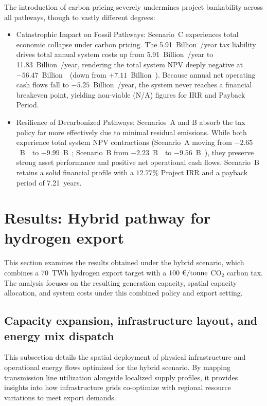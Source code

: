 \documentclass[preprint,12pt]{elsarticle}
\begin{document}
The introduction of carbon pricing severely undermines project bankability across all pathways, though to vastly different degrees:

\begin{itemize}
    \item {Catastrophic Impact on Fossil Pathways:} Scenario~C experiences total economic collapse under carbon pricing. The 5.91~Billion~\texteuro/year tax liability drives total annual system costs up from 5.91~Billion~\texteuro/year to 11.83~Billion~\texteuro/year, rendering the total system NPV deeply negative at $-56.47$~Billion~\texteuro~(down from $+7.11$~Billion~\texteuro). Because annual net operating cash flows fall to $-5.25$~Billion~\texteuro/year, the system never reaches a financial breakeven point, yielding non-viable (N/A) figures for IRR and Payback Period.
    \item {Resilience of Decarbonized Pathways:} Scenarios~A and B absorb the tax policy far more effectively due to minimal residual emissions. While both experience total system NPV contractions (Scenario~A moving from $-2.65$~B~\texteuro~to $-9.99$~B~\texteuro; Scenario~B from $-2.23$~B~\texteuro~to $-9.56$~B~\texteuro), they preserve strong asset performance and positive net operational cash flows. Scenario~B retains a solid financial profile with a $12.77\%$ Project IRR and a payback period of 7.21~years.
\end{itemize}

\section{Results: Hybrid pathway for hydrogen export}
\label{sec:results_hybrid_h2} 
This section examines the results obtained under the hybrid scenario, which combines a 70~TWh hydrogen export target with a $100\text{~\texteuro/tonne}$ $\text{CO}_2$ carbon tax. The analysis focuses on the resulting generation capacity, spatial capacity allocation, and system costs under this combined policy and export setting.

\subsection{Capacity expansion, infrastructure layout, and energy mix dispatch}
This subsection details the spatial deployment of physical infrastructure and operational energy flows optimized for the hybrid scenario. By mapping transmission line utilization alongside localized supply profiles, it provides insights into how infrastructure grids co-optimize with regional resource variations to meet export demands.
\end{document}
